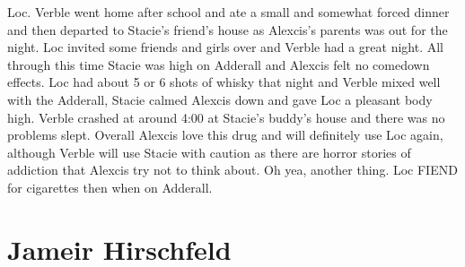 \documentclass[12pt]{book}
\begin{document}
Loc. Verble went home after school and ate a small and somewhat forced dinner and then departed to Stacie's friend's house as Alexcis's parents was out for the night. Loc invited some friends and girls over and Verble had a great night. All through this time Stacie was high on Adderall and Alexcis felt no comedown effects. Loc had about 5 or 6 shots of whisky that night and Verble mixed well with the Adderall, Stacie calmed Alexcis down and gave Loc a pleasant body high. Verble crashed at around 4:00 at Stacie's buddy's house and there was no problems slept. Overall Alexcis love this drug and will definitely use Loc again, although Verble will use Stacie with caution as there are horror stories of addiction that Alexcis try not to think about. Oh yea, another thing. Loc FIEND for cigarettes then when on Adderall.



\chapter{Jameir Hirschfeld}
\end{document}
